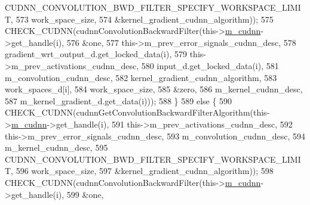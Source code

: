 \begin{DoxyCode}
      CUDNN\_CONVOLUTION\_BWD\_FILTER\_SPECIFY\_WORKSPACE\_LIMIT,
573                                                                  work\_space\_size,
574                                                                  &kernel\_gradient\_cudnn\_algorithm));
575           CHECK\_CUDNN(cudnnConvolutionBackwardFilter(this->\hyperlink{classlbann_1_1Layer_a08dbb94239e3b8c96329786c57c72e21}{m\_cudnn}->get\_handle(i),
576                                                      &one,
577                                                      this->m\_prev\_error\_signals\_cudnn\_desc,
578                                                      gradient\_wrt\_output\_d.get\_locked\_data(i),
579                                                      this->m\_prev\_activations\_cudnn\_desc,
580                                                      input\_d.get\_locked\_data(i),
581                                                      m\_convolution\_cudnn\_desc,
582                                                      kernel\_gradient\_cudnn\_algorithm,
583                                                      work\_spaces\_d[i],
584                                                      work\_space\_size,
585                                                      &zero,
586                                                      m\_kernel\_cudnn\_desc,
587                                                      m\_kernel\_gradient\_d.get\_data(i)));
588         \}
589         \textcolor{keywordflow}{else} \{
590           CHECK\_CUDNN(cudnnGetConvolutionBackwardFilterAlgorithm(this->\hyperlink{classlbann_1_1Layer_a08dbb94239e3b8c96329786c57c72e21}{m\_cudnn}->get\_handle(i),
591                                                                  this->m\_prev\_activations\_cudnn\_desc,
592                                                                  this->m\_prev\_error\_signals\_cudnn\_desc,
593                                                                  m\_convolution\_cudnn\_desc,
594                                                                  m\_kernel\_cudnn\_desc,
595                                                                  
      CUDNN\_CONVOLUTION\_BWD\_FILTER\_SPECIFY\_WORKSPACE\_LIMIT,
596                                                                  work\_space\_size,
597                                                                  &kernel\_gradient\_cudnn\_algorithm));
598           CHECK\_CUDNN(cudnnConvolutionBackwardFilter(this->\hyperlink{classlbann_1_1Layer_a08dbb94239e3b8c96329786c57c72e21}{m\_cudnn}->get\_handle(i),
599                                                      &one,

\end{DoxyCode}
